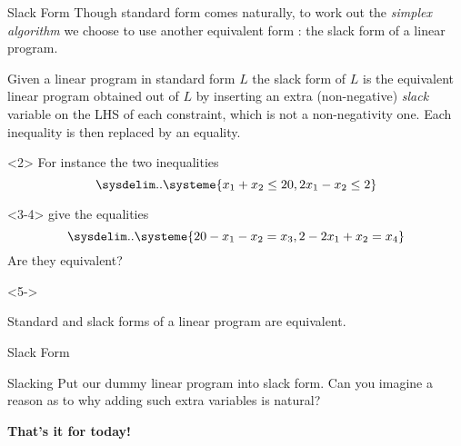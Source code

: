 \documentclass[aspectratio = 169]{beamer}
\begin{document}
\begin{frame}{Slack Form}
  Though standard form comes naturally, to work out the \emph{simplex
    algorithm} we choose to use another equivalent form : the slack
  form of a linear program.
  \begin{defn}
    Given a linear program in standard form $L$ the slack form of $L$
    is the equivalent linear program obtained out of $L$ by inserting
    an extra (non-negative) \emph{slack} variable on the LHS of each
    constraint, which is not a non-negativity one. Each inequality is
    then replaced by an equality.
  \end{defn}
  \vspace{1em}
  \begin{overlayarea}{\textwidth}{.35\textheight}
    \begin{onlyenv}<2>
      For instance the two inequalities
      \[
      \sysdelim..\systeme{x_1 + x_2 \leq 20, 2x_1 - x_2 \leq 2}
      \]
    \end{onlyenv}
    \begin{onlyenv}<3-4>
      give the equalities
      \[
      \sysdelim..\systeme{20 - x_1 - x_2 = x_3, 2 - 2x_1 + x_2 = x_4 }
      \]
      \pause[4] Are they equivalent?
    \end{onlyenv}
    \begin{onlyenv}<5->
      \vspace{-\baselineskip}
      \begin{prop}
        Standard and slack forms of a linear program are equivalent.
      \end{prop}
    \end{onlyenv}
  \end{overlayarea}
\end{frame}

\begin{frame}{Slack Form}
  \begin{halfshyblock}{Slacking}
    Put our dummy linear program into slack form. Can you imagine a
    reason as to why adding such extra variables is natural?
  \end{halfshyblock}
\end{frame}

\begin{frame}
  \begin{center}
    {\huge \textbf{That's it for today!}}
   \end{center}
 \end{frame}

\end{document}
